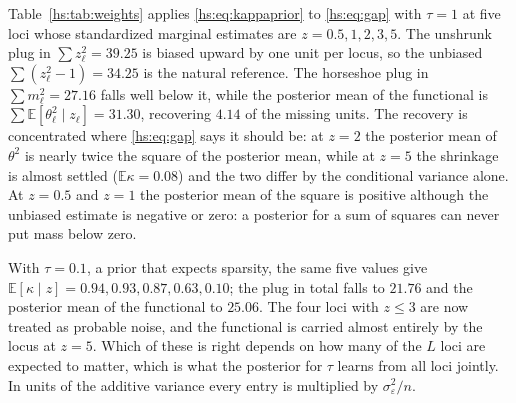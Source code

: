 \begin{example}
\label{hs:ex:weights}
Table~\ref{hs:tab:weights} applies \eqref{hs:eq:kappaprior} to \eqref{hs:eq:gap} with $\tau = 1$ at five loci whose standardized marginal estimates are $z = 0.5, 1, 2, 3, 5$. The unshrunk plug in $\sum z_\ell^2 = 39.25$ is biased upward by one unit per locus, so the unbiased $\sum(z^2_\ell - 1) = 34.25$ is the natural reference. The horseshoe plug in $\sum m_\ell^2 = 27.16$ falls well below it, while the posterior mean of the functional is $\sum\mathbb{E}[\theta^2_\ell\mid z_\ell] = 31.30$, recovering $4.14$ of the missing units. The recovery is concentrated where \eqref{hs:eq:gap} says it should be: at $z = 2$ the posterior mean of $\theta^2$ is nearly twice the square of the posterior mean, while at $z = 5$ the shrinkage is almost settled ($\mathbb{E}\kappa = 0.08$) and the two differ by the conditional variance alone. At $z = 0.5$ and $z = 1$ the posterior mean of the square is positive although the unbiased estimate is negative or zero: a posterior for a sum of squares can never put mass below zero.

With $\tau = 0.1$, a prior that expects sparsity, the same five values give $\mathbb{E}[\kappa\mid z] = 0.94, 0.93, 0.87, 0.63, 0.10$; the plug in total falls to $21.76$ and the posterior mean of the functional to $25.06$. The four loci with $z \le 3$ are now treated as probable noise, and the functional is carried almost entirely by the locus at $z = 5$. Which of these is right depends on how many of the $L$ loci are expected to matter, which is what the posterior for $\tau$ learns from all loci jointly. In units of the additive variance every entry is multiplied by $\sigma^2_\varepsilon/n$.
\end{example}

